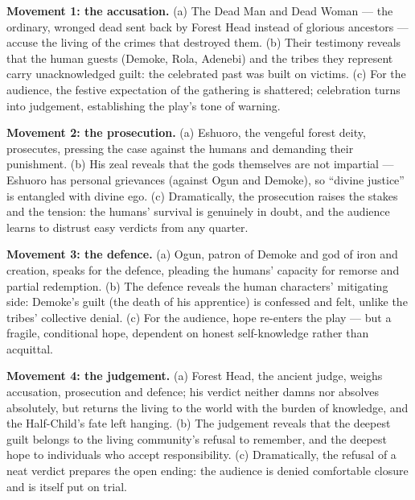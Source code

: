\documentclass[11pt]{article}
\begin{document}
\begin{corrige}
\textbf{Movement 1: the accusation.} (a) The Dead Man and Dead Woman --- the ordinary, wronged dead sent back by Forest Head instead of glorious ancestors --- accuse the living of the crimes that destroyed them. (b) Their testimony reveals that the human guests (Demoke, Rola, Adenebi) and the tribes they represent carry unacknowledged guilt: the celebrated past was built on victims. (c) For the audience, the festive expectation of the gathering is shattered; celebration turns into judgement, establishing the play's tone of warning.

\textbf{Movement 2: the prosecution.} (a) Eshuoro, the vengeful forest deity, prosecutes, pressing the case against the humans and demanding their punishment. (b) His zeal reveals that the gods themselves are not impartial --- Eshuoro has personal grievances (against Ogun and Demoke), so ``divine justice'' is entangled with divine ego. (c) Dramatically, the prosecution raises the stakes and the tension: the humans' survival is genuinely in doubt, and the audience learns to distrust easy verdicts from any quarter.

\textbf{Movement 3: the defence.} (a) Ogun, patron of Demoke and god of iron and creation, speaks for the defence, pleading the humans' capacity for remorse and partial redemption. (b) The defence reveals the human characters' mitigating side: Demoke's guilt (the death of his apprentice) is confessed and felt, unlike the tribes' collective denial. (c) For the audience, hope re-enters the play --- but a fragile, conditional hope, dependent on honest self-knowledge rather than acquittal.

\textbf{Movement 4: the judgement.} (a) Forest Head, the ancient judge, weighs accusation, prosecution and defence; his verdict neither damns nor absolves absolutely, but returns the living to the world with the burden of knowledge, and the Half-Child's fate left hanging. (b) The judgement reveals that the deepest guilt belongs to the living community's refusal to remember, and the deepest hope to individuals who accept responsibility. (c) Dramatically, the refusal of a neat verdict prepares the open ending: the audience is denied comfortable closure and is itself put on trial.
\end{corrige}
\end{document}

